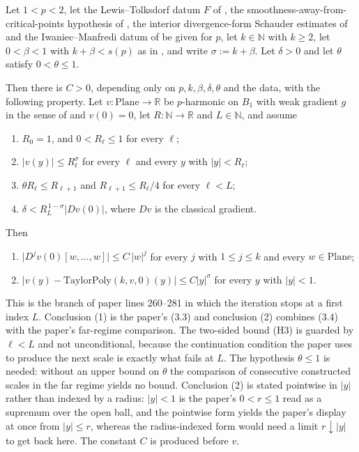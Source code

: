 \begin{lemma}
Let $1<p<2$, let the Lewis--Tolksdorf datum $F$ of , the
smoothness-away-from-critical-points hypothesis of , the
interior divergence-form Schauder estimates of  and the
Iwaniec--Manfredi datum of  be given for $p$, let $k\in\mathbb{N}$
with $k\ge2$, let $0<\beta<1$ with $k+\beta<s(p)$ as in , and write
$\sigma:=k+\beta$.  Let $\delta>0$ and let $\theta$ satisfy $0<\theta\le1$.

Then there is $C>0$, depending only on $p,k,\beta,\delta,\theta$ and the data, with the
following property.  Let $v\colon\mathrm{Plane}\to\mathbb{R}$ be $p$-harmonic on $B_1$ with weak
gradient $g$ in the sense of  and $v(0)=0$, let $R\colon\mathbb{N}\to\mathbb{R}$
and $L\in\mathbb{N}$, and assume
\begin{enumerate}
\item[(H1)] $R_0=1$, and $0<R_\ell\le1$ for every $\ell$;
\item[(H2)] $\lvert v(y)\rvert\le R_\ell^{\sigma}$ for every $\ell$ and every $y$ with
  $\lvert y\rvert<R_\ell$;
\item[(H3)] $\theta R_\ell\le R_{\ell+1}$ and $R_{\ell+1}\le R_\ell/4$ for every $\ell<L$;
\item[(H4)] $\delta<R_L^{\,1-\sigma}\lvert Dv(0)\rvert$, where $Dv$ is the classical gradient.
\end{enumerate}
Then
\begin{enumerate}
\item $\bigl\lvert D^{j}v(0)[w,\ldots,w]\bigr\rvert\le C\,\lvert w\rvert^{j}$ for every $j$ with
  $1\le j\le k$ and every $w\in\mathrm{Plane}$;
\item $\bigl\lvert v(y)-\mathrm{TaylorPoly}(k,v,0)(y)\bigr\rvert\le C\lvert y\rvert^{\sigma}$
  for every $y$ with $\lvert y\rvert<1$.
\end{enumerate}

This is the branch of paper lines 260--281 in which the iteration stops at a first index $L$.
Conclusion (1) is the paper's (3.3) and conclusion (2) combines (3.4) with the
paper's far-regime comparison.  The two-sided bound (H3) is guarded by $\ell<L$ and not
unconditional, because the continuation condition the paper uses to produce the next scale is
exactly what fails at $L$.  The hypothesis $\theta\le1$ is needed: without an upper bound on
$\theta$ the comparison of consecutive constructed scales in the far regime yields no bound.
Conclusion (2) is stated pointwise in $\lvert y\rvert$ rather than indexed by a radius:
$\lvert y\rvert<1$ is the paper's $0<r\le1$ read as a supremum over the open ball, and the
pointwise form yields the paper's display at once from $\lvert y\rvert\le r$, whereas the
radius-indexed form would need a limit $r\downarrow\lvert y\rvert$ to get back here.  The constant $C$ is produced before $v$.
\end{lemma}
